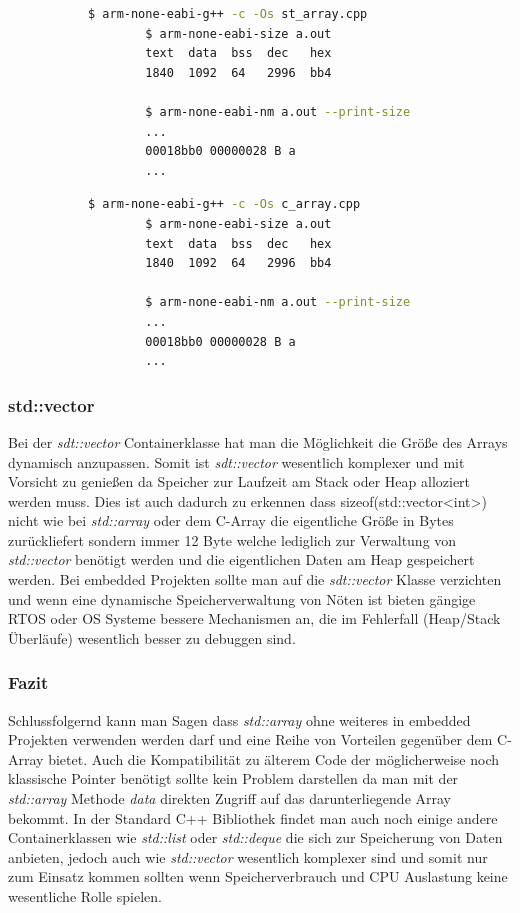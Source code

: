 \documentclass[MES,Master,ngerman]{twbook}%
\begin{document}
\begin{figure}[!htb]
	\begin{subfigure}[b]{0.5\textwidth}
		\begin{lstlisting}[gobble=6, title={std::array}, language=bash, numbers=none]
		$ arm-none-eabi-g++ -c -Os st_array.cpp
		$ arm-none-eabi-size a.out
		text  data  bss  dec   hex
		1840  1092  64   2996  bb4
		
		$ arm-none-eabi-nm a.out --print-size
		...
		00018bb0 00000028 B a
		...
		\end{lstlisting}
	\end{subfigure}
	\begin{subfigure}[b]{0.5\textwidth}
		\begin{lstlisting}[gobble=6, title={C-Array}, language=bash, numbers=none]
		$ arm-none-eabi-g++ -c -Os c_array.cpp
		$ arm-none-eabi-size a.out
		text  data  bss  dec   hex
		1840  1092  64   2996  bb4
		
		$ arm-none-eabi-nm a.out --print-size
		...
		00018bb0 00000028 B a
		...
		\end{lstlisting}
	\end{subfigure}
\end{figure}

\subsubsection{std::vector}
Bei der \textit{sdt::vector} Containerklasse hat man die Möglichkeit die Größe des Arrays dynamisch anzupassen. Somit ist \textit{sdt::vector} wesentlich komplexer und mit Vorsicht zu genießen da Speicher zur Laufzeit am Stack oder Heap alloziert werden muss. Dies ist auch dadurch zu erkennen dass sizeof(std::vector<int>) nicht wie bei \textit{std::array} oder dem C-Array die eigentliche Größe in Bytes zurückliefert sondern immer 12 Byte welche lediglich zur Verwaltung von \textit{std::vector} benötigt werden und die eigentlichen Daten am Heap gespeichert werden. Bei embedded Projekten sollte man auf die \textit{sdt::vector} Klasse verzichten und wenn eine dynamische Speicherverwaltung von Nöten ist bieten gängige RTOS oder OS Systeme bessere Mechanismen an, die im Fehlerfall (Heap/Stack Überläufe) wesentlich besser zu debuggen sind.

\subsubsection{Fazit}
Schlussfolgernd kann man Sagen dass \textit{std::array} ohne weiteres in embedded Projekten verwenden werden darf und eine Reihe von Vorteilen gegenüber dem C-Array bietet. Auch die Kompatibilität zu älterem Code der möglicherweise noch klassische Pointer benötigt sollte kein Problem darstellen da man mit der \textit{std::array} Methode \textit{data} direkten Zugriff auf das darunterliegende Array bekommt. In der Standard C++ Bibliothek findet man auch noch einige andere Containerklassen wie \textit{std::list} oder \textit{std::deque} die sich zur Speicherung von Daten anbieten, jedoch auch wie \textit{std::vector} wesentlich komplexer sind und somit nur zum Einsatz kommen sollten wenn Speicherverbrauch und CPU Auslastung keine wesentliche Rolle spielen.
\newpage
\end{document}
